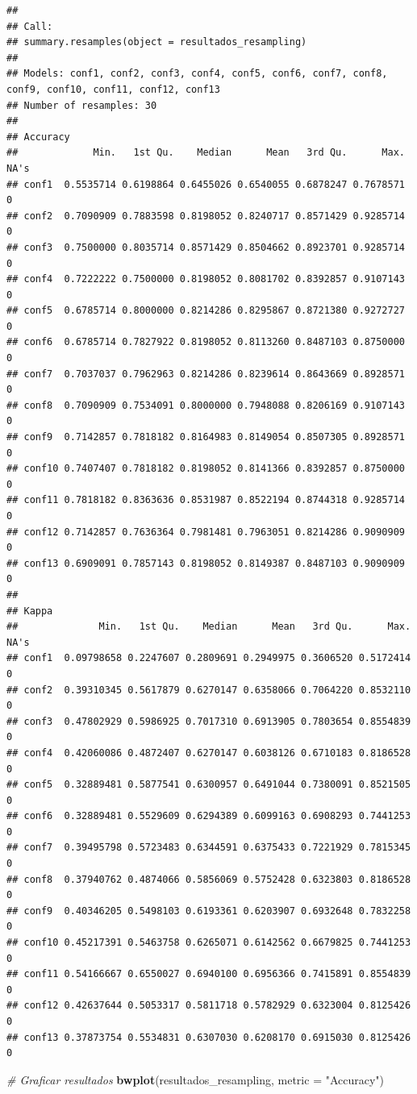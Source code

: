 \documentclass[
]{article}
\newenvironment{Shaded}{\begin{snugshade}}{\end{snugshade}}
\newcommand{\AttributeTok}[1]{\textcolor[rgb]{0.13,0.29,0.53}{#1}}
\newcommand{\CommentTok}[1]{\textcolor[rgb]{0.56,0.35,0.01}{\textit{#1}}}
\newcommand{\FunctionTok}[1]{\textcolor[rgb]{0.13,0.29,0.53}{\textbf{#1}}}
\newcommand{\NormalTok}[1]{#1}
\newcommand{\StringTok}[1]{\textcolor[rgb]{0.31,0.60,0.02}{#1}}
\begin{document}
\begin{verbatim}
## 
## Call:
## summary.resamples(object = resultados_resampling)
## 
## Models: conf1, conf2, conf3, conf4, conf5, conf6, conf7, conf8, conf9, conf10, conf11, conf12, conf13 
## Number of resamples: 30 
## 
## Accuracy 
##             Min.   1st Qu.    Median      Mean   3rd Qu.      Max. NA's
## conf1  0.5535714 0.6198864 0.6455026 0.6540055 0.6878247 0.7678571    0
## conf2  0.7090909 0.7883598 0.8198052 0.8240717 0.8571429 0.9285714    0
## conf3  0.7500000 0.8035714 0.8571429 0.8504662 0.8923701 0.9285714    0
## conf4  0.7222222 0.7500000 0.8198052 0.8081702 0.8392857 0.9107143    0
## conf5  0.6785714 0.8000000 0.8214286 0.8295867 0.8721380 0.9272727    0
## conf6  0.6785714 0.7827922 0.8198052 0.8113260 0.8487103 0.8750000    0
## conf7  0.7037037 0.7962963 0.8214286 0.8239614 0.8643669 0.8928571    0
## conf8  0.7090909 0.7534091 0.8000000 0.7948088 0.8206169 0.9107143    0
## conf9  0.7142857 0.7818182 0.8164983 0.8149054 0.8507305 0.8928571    0
## conf10 0.7407407 0.7818182 0.8198052 0.8141366 0.8392857 0.8750000    0
## conf11 0.7818182 0.8363636 0.8531987 0.8522194 0.8744318 0.9285714    0
## conf12 0.7142857 0.7636364 0.7981481 0.7963051 0.8214286 0.9090909    0
## conf13 0.6909091 0.7857143 0.8198052 0.8149387 0.8487103 0.9090909    0
## 
## Kappa 
##              Min.   1st Qu.    Median      Mean   3rd Qu.      Max. NA's
## conf1  0.09798658 0.2247607 0.2809691 0.2949975 0.3606520 0.5172414    0
## conf2  0.39310345 0.5617879 0.6270147 0.6358066 0.7064220 0.8532110    0
## conf3  0.47802929 0.5986925 0.7017310 0.6913905 0.7803654 0.8554839    0
## conf4  0.42060086 0.4872407 0.6270147 0.6038126 0.6710183 0.8186528    0
## conf5  0.32889481 0.5877541 0.6300957 0.6491044 0.7380091 0.8521505    0
## conf6  0.32889481 0.5529609 0.6294389 0.6099163 0.6908293 0.7441253    0
## conf7  0.39495798 0.5723483 0.6344591 0.6375433 0.7221929 0.7815345    0
## conf8  0.37940762 0.4874066 0.5856069 0.5752428 0.6323803 0.8186528    0
## conf9  0.40346205 0.5498103 0.6193361 0.6203907 0.6932648 0.7832258    0
## conf10 0.45217391 0.5463758 0.6265071 0.6142562 0.6679825 0.7441253    0
## conf11 0.54166667 0.6550027 0.6940100 0.6956366 0.7415891 0.8554839    0
## conf12 0.42637644 0.5053317 0.5811718 0.5782929 0.6323004 0.8125426    0
## conf13 0.37873754 0.5534831 0.6307030 0.6208170 0.6915030 0.8125426    0
\end{verbatim}

\begin{Shaded}
\begin{Highlighting}[]
\CommentTok{\# Graficar resultados}
\FunctionTok{bwplot}\NormalTok{(resultados\_resampling, }\AttributeTok{metric =} \StringTok{"Accuracy"}\NormalTok{)}
\end{Highlighting}
\end{Shaded}
\end{document}
